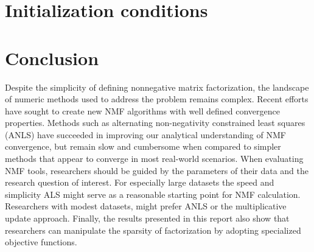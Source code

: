 \documentclass[final,leqno,onefignum,onetabnum]{siamltex1213}
\begin{document}
\section{Initialization conditions}

\section{Conclusion} Despite the simplicity of defining nonnegative matrix factorization, the landscape of numeric methods used to address the problem remains complex. Recent efforts have sought to create new NMF algorithms with well defined convergence properties. Methods such as alternating non-negativity constrained least squares (ANLS) have succeeded in improving our analytical understanding of NMF convergence, but remain slow and cumbersome when compared to simpler methods that appear to converge in most real-world scenarios. When evaluating NMF tools, researchers should be guided by the parameters of their data and the research question of interest. For especially large datasets the speed and simplicity ALS might serve as a reasonable starting point for NMF calculation. Researchers with modest datasets, might prefer ANLS or the multiplicative update approach. Finally, the results presented in this report also show that researchers can manipulate the sparsity of factorization by adopting specialized objective functions. 
\end{document}
